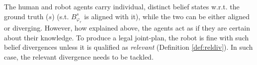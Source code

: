 \documentclass[letterpaper]{article} %
\begin{document}





The human and robot agents carry individual, distinct belief states w.r.t. the ground truth ($s$) (s.t. $\mathit{B}_{\varphi_r}^s$ is aligned with it), while the two can be either aligned or diverging. However, how explained above, the agents act as if they are certain about their knowledge.
To produce a legal joint-plan, the robot is fine with such belief divergences unless it is qualified as \textit{relevant} (Definition \ref{def:reldiv}). In such case, the relevant divergence needs to be tackled.
\end{document}
